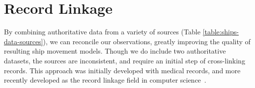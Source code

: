



\section{Record Linkage}

By combining authoritative data from a variety of sources (Table \ref{table:ships-data-sources}), we can reconcile our observations, greatly improving the quality of resulting ship movement models. Though we do include two authoritative datasets, the sources are inconsistent, and require an initial step of cross-linking records. This approach was initially developed with medical records, and more recently developed as the record linkage field in computer science~\citep{Christen2012}.

